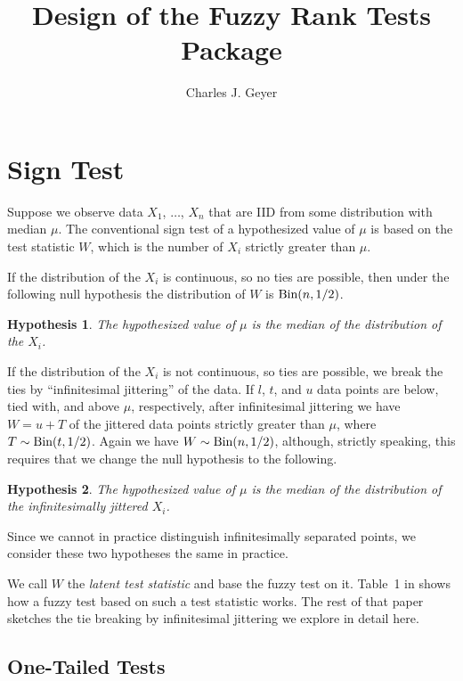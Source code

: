 \documentclass{article}
\newcommand{\BinomialDis}{\text{\upshape Bin}}
\newtheorem{hypothesis}{Hypothesis}
\begin{document}
\title{Design of the Fuzzy Rank Tests Package}
\author{Charles J. Geyer}
\maketitle

\section{Sign Test}

Suppose we observe data $X_1$, $\ldots$, $X_n$ that are IID from some
distribution with median $\mu$.  The conventional sign test of a hypothesized
value of $\mu$ is based on the test statistic $W$, which is the number of $X_i$
strictly greater than $\mu$.

If the distribution of the $X_i$ is continuous, so no ties are possible,
then under the following null hypothesis the distribution of $W$
is $\BinomialDis(n, 1 / 2)$.
\begin{hypothesis} \label{null-sign}
The hypothesized value of $\mu$ is the median of the distribution
    of the $X_i$.
\end{hypothesis}

If the distribution of the $X_i$ is not continuous, so ties are possible,
we break the ties by ``infinitesimal jittering'' of the data.
If $l$, $t$, and $u$ data points are below, tied with, and above $\mu$,
respectively, after infinitesimal jittering we have $W = u + T$ of the
jittered data points strictly greater than $\mu$,
where $T \sim \BinomialDis(t, 1 / 2)$.
Again we have $W \sim \BinomialDis(n, 1 / 2)$,
although, strictly speaking, this requires that we change the null hypothesis
to the following.
\begin{hypothesis} \label{null-sign-jittered}
The hypothesized value of $\mu$ is the median of the distribution
    of the infinitesimally jittered $X_i$.
\end{hypothesis}
Since we cannot in practice distinguish infinitesimally separated points,
we consider these two hypotheses the same in practice.

We call $W$ the \emph{latent test statistic} and base the fuzzy test
on it.  Table~1 in \citet{fuzzy-rank} shows how a fuzzy test based
on such a test statistic works.  The rest of that paper sketches the
tie breaking by infinitesimal jittering we explore in detail here.

\subsection{One-Tailed Tests}
\end{document}
